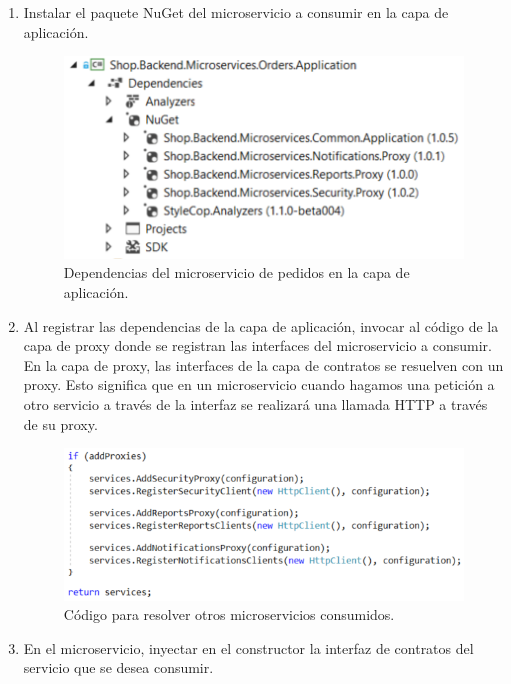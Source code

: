 \documentclass[11pt,spanish,listoffigures]{tfgetsinf}
\begin{document}
\begin{enumerate}

\item Instalar el paquete NuGet del microservicio a consumir en la capa de aplicación.

\begin{figure}[h]
\centering
\includegraphics[scale=0.85]{OrdersApplicationDependencies}
\caption{Dependencias del microservicio de pedidos en la capa de aplicación.}
\end{figure}

\item Al registrar las dependencias de la capa de aplicación, invocar al código de la capa de proxy donde se registran las interfaces del microservicio a consumir. En la capa de proxy, las interfaces de la capa de contratos se resuelven con un proxy. Esto significa que en un microservicio cuando hagamos una petición a otro servicio a través de la interfaz se realizará una llamada HTTP a través de su proxy.

\begin{figure}[h]
\centering
\includegraphics[scale=0.85]{UsingMicroservices}
\caption{Código para resolver otros microservicios consumidos.}
\end{figure}

\item En el microservicio, inyectar en el constructor la interfaz de contratos del servicio que se desea consumir.

\end{enumerate}
\end{document}
